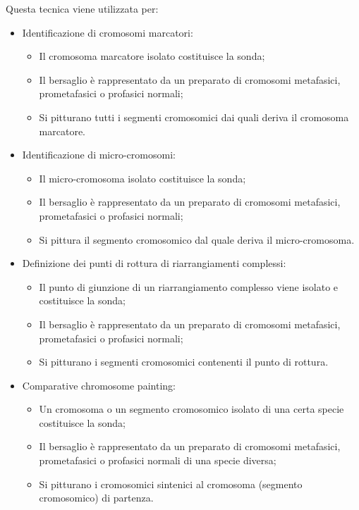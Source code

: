 \documentclass[11pt]{book}
\begin{document}
Questa tecnica viene utilizzata per:
\begin{itemize}
\item Identificazione di cromosomi marcatori:
	\begin{itemize}
	\item Il cromosoma marcatore isolato costituisce la sonda;
	\item Il bersaglio è rappresentato da un preparato di cromosomi metafasici, prometafasici o profasici normali;
	\item Si pitturano tutti i segmenti cromosomici dai quali deriva il cromosoma marcatore.
	\end{itemize}

\item Identificazione di micro-cromosomi:
	\begin{itemize}
	\item Il micro-cromosoma isolato costituisce la sonda;
	\item Il bersaglio è rappresentato da un preparato di cromosomi metafasici, prometafasici o profasici normali;
	\item Si pittura il segmento cromosomico dal quale deriva il micro-cromosoma.
	\end{itemize}

\item Definizione dei punti di rottura di riarrangiamenti complessi:
	\begin{itemize}
	\item Il punto di giunzione di un riarrangiamento complesso viene isolato e costituisce la sonda;
	\item Il bersaglio è rappresentato da un preparato di cromosomi metafasici, prometafasici o profasici normali;
	\item Si pitturano i segmenti cromosomici contenenti il punto di rottura.
	\end{itemize}

\item Comparative chromosome painting:
	\begin{itemize}
	\item Un cromosoma o un segmento cromosomico isolato di una certa specie costituisce la sonda;
	\item Il bersaglio è rappresentato da un preparato di cromosomi metafasici, prometafasici o profasici normali di una specie diversa;
	\item Si pitturano i cromosomici sintenici al cromosoma (segmento cromosomico) di partenza.
	\end{itemize}
\end{itemize}
\end{document}
